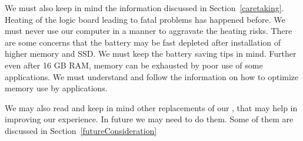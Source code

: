 We must also keep in mind the information discussed in Section~\ref{caretaking}. Heating of the logic board leading to fatal problems has happened before. We must never use our computer in a manner to aggravate the heating risks. There are some concerns that the battery may be fast depleted after installation of higher memory and SSD. We must keep the battery saving tips in mind. Further even after 16 GB RAM, memory can be exhausted by poor use of some applications. We must understand and follow the information on how to optimize memory use by applications.

We may also read and keep in mind other replacements of our \model, that may help in improving our experience. In future we may need to do them. Some of them are discussed in Section~\ref{futureConsideration}

